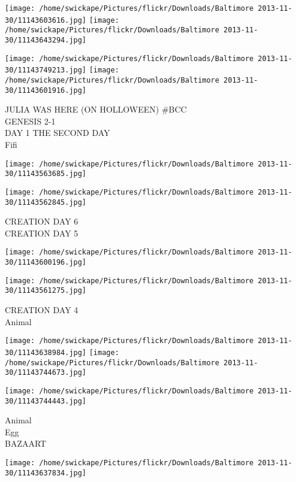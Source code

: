 \documentclass[10pt,letterpaper]{article}
\begin{document}
\texttt{[image: /home/swickape/Pictures/flickr/Downloads/Baltimore 2013-11-30/11143603616.jpg]}
\texttt{[image: /home/swickape/Pictures/flickr/Downloads/Baltimore 2013-11-30/11143643294.jpg]}

\texttt{[image: /home/swickape/Pictures/flickr/Downloads/Baltimore 2013-11-30/11143749213.jpg]}
\texttt{[image: /home/swickape/Pictures/flickr/Downloads/Baltimore 2013-11-30/11143601916.jpg]}

JULIA WAS HERE (ON HOLLOWEEN) \#BCC\\
GENESIS 2{-}1\\
DAY 1 THE SECOND DAY\\
Fifi\\
\pagebreak

\texttt{[image: /home/swickape/Pictures/flickr/Downloads/Baltimore 2013-11-30/11143563685.jpg]}

\vspace{0.25in}
\texttt{[image: /home/swickape/Pictures/flickr/Downloads/Baltimore 2013-11-30/11143562845.jpg]}

CREATION DAY 6\\
CREATION DAY 5\\
\pagebreak

\texttt{[image: /home/swickape/Pictures/flickr/Downloads/Baltimore 2013-11-30/11143600196.jpg]}

\vspace{0.25in}
\texttt{[image: /home/swickape/Pictures/flickr/Downloads/Baltimore 2013-11-30/11143561275.jpg]}

CREATION DAY 4\\
Animal\\
\pagebreak

\texttt{[image: /home/swickape/Pictures/flickr/Downloads/Baltimore 2013-11-30/11143638984.jpg]}
\texttt{[image: /home/swickape/Pictures/flickr/Downloads/Baltimore 2013-11-30/11143744673.jpg]}

\vspace{0.25in}
\texttt{[image: /home/swickape/Pictures/flickr/Downloads/Baltimore 2013-11-30/11143744443.jpg]}

Animal\\
Egg\\
BAZAART\\
\pagebreak

\texttt{[image: /home/swickape/Pictures/flickr/Downloads/Baltimore 2013-11-30/11143637834.jpg]}
\end{document}
